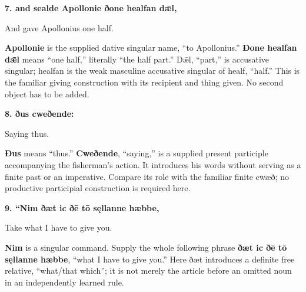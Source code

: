 \textbf{7. and sealde Apollonie ðone healfan dǣl,}

And gave Apollonius one half.

\textbf{Apollonie} is the supplied dative singular name, “to Apollonius.” \textbf{Ðone healfan dǣl} means “one half,” literally “the half part.” Dǣl, “part,” is accusative singular; healfan is the weak masculine accusative singular of healf, “half.” This is the familiar giving construction with its recipient and thing given. No second object has to be added.

\textbf{8. ðus cweðende:}

Saying thus.

\textbf{Ðus} means “thus.” \textbf{Cweðende}, “saying,” is a supplied present participle accompanying the fisherman’s action. It introduces his words without serving as a finite past or an imperative. Compare its role with the familiar finite cwæð; no productive participial construction is required here.

\textbf{9. “Nim ðæt ic ðē tō sęllanne hæbbe,}

Take what I have to give you.

\textbf{Nim} is a singular command. Supply the whole following phrase \textbf{ðæt ic ðē tō sęllanne hæbbe}, “what I have to give you.” Here ðæt introduces a definite free relative, “what/\allowbreak{}that which”; it is not merely the article before an omitted noun in an independently learned rule.

